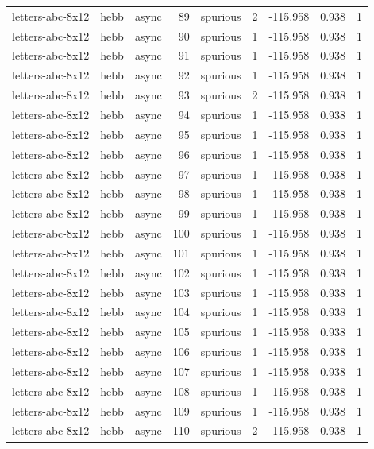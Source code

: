 \begin{tabular}{lllrlrrrr}
letters-abc-8x12 & hebb & async & 89 & spurious & 2 & -115.958 & 0.938 & 1 \\
letters-abc-8x12 & hebb & async & 90 & spurious & 1 & -115.958 & 0.938 & 1 \\
letters-abc-8x12 & hebb & async & 91 & spurious & 1 & -115.958 & 0.938 & 1 \\
letters-abc-8x12 & hebb & async & 92 & spurious & 1 & -115.958 & 0.938 & 1 \\
letters-abc-8x12 & hebb & async & 93 & spurious & 2 & -115.958 & 0.938 & 1 \\
letters-abc-8x12 & hebb & async & 94 & spurious & 1 & -115.958 & 0.938 & 1 \\
letters-abc-8x12 & hebb & async & 95 & spurious & 1 & -115.958 & 0.938 & 1 \\
letters-abc-8x12 & hebb & async & 96 & spurious & 1 & -115.958 & 0.938 & 1 \\
letters-abc-8x12 & hebb & async & 97 & spurious & 1 & -115.958 & 0.938 & 1 \\
letters-abc-8x12 & hebb & async & 98 & spurious & 1 & -115.958 & 0.938 & 1 \\
letters-abc-8x12 & hebb & async & 99 & spurious & 1 & -115.958 & 0.938 & 1 \\
letters-abc-8x12 & hebb & async & 100 & spurious & 1 & -115.958 & 0.938 & 1 \\
letters-abc-8x12 & hebb & async & 101 & spurious & 1 & -115.958 & 0.938 & 1 \\
letters-abc-8x12 & hebb & async & 102 & spurious & 1 & -115.958 & 0.938 & 1 \\
letters-abc-8x12 & hebb & async & 103 & spurious & 1 & -115.958 & 0.938 & 1 \\
letters-abc-8x12 & hebb & async & 104 & spurious & 1 & -115.958 & 0.938 & 1 \\
letters-abc-8x12 & hebb & async & 105 & spurious & 1 & -115.958 & 0.938 & 1 \\
letters-abc-8x12 & hebb & async & 106 & spurious & 1 & -115.958 & 0.938 & 1 \\
letters-abc-8x12 & hebb & async & 107 & spurious & 1 & -115.958 & 0.938 & 1 \\
letters-abc-8x12 & hebb & async & 108 & spurious & 1 & -115.958 & 0.938 & 1 \\
letters-abc-8x12 & hebb & async & 109 & spurious & 1 & -115.958 & 0.938 & 1 \\
letters-abc-8x12 & hebb & async & 110 & spurious & 2 & -115.958 & 0.938 & 1 \\

\end{tabular}
